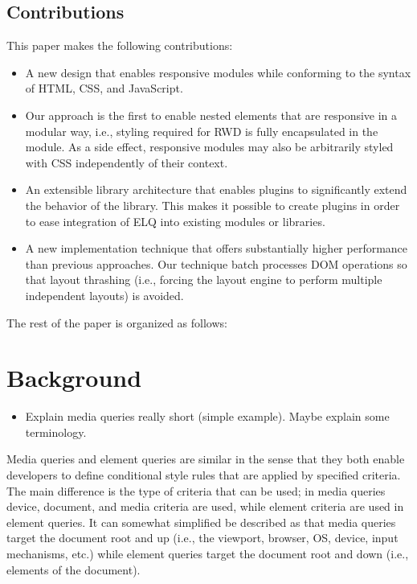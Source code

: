 \documentclass{acm_proc_article-sp}
\newcommand{\elq}{ELQ}
\begin{document}
    \subsection{Contributions}
      This paper makes the following contributions:
      \begin{itemize}
        \item A new design that enables responsive modules while conforming to the syntax of HTML, CSS, and JavaScript.
        \item
          Our approach is the first to enable nested elements that are responsive in a modular way, i.e., styling required for RWD is fully encapsulated in the module.
          As a side effect, responsive modules may also be arbitrarily styled with CSS independently of their context.
        \item
          An extensible library architecture that enables plugins to significantly extend the behavior of the library.
          This makes it possible to create plugins in order to ease integration of \elq{} into existing modules or libraries.
        \item
          A new implementation technique that offers substantially higher performance than previous approaches.
          Our technique batch processes DOM operations so that layout thrashing (i.e., forcing the layout engine to perform multiple independent layouts) is avoided.
      \end{itemize}

    The rest of the paper is organized as follows:


\section{Background}
  \begin{itemize}
    \item Explain media queries really short (simple example). Maybe explain some terminology.
  \end{itemize}

  Media queries and element queries are similar in the sense that they both enable developers to define conditional style rules that are applied by specified criteria.
  The main difference is the type of criteria that can be used; in media queries device, document, and media criteria are used, while element criteria are used in element queries.
  It can somewhat simplified be described as that media queries target the document root and up (i.e., the viewport, browser, OS, device, input mechanisms, etc.) while element queries target the document root and down (i.e., elements of the document).
\end{document}
